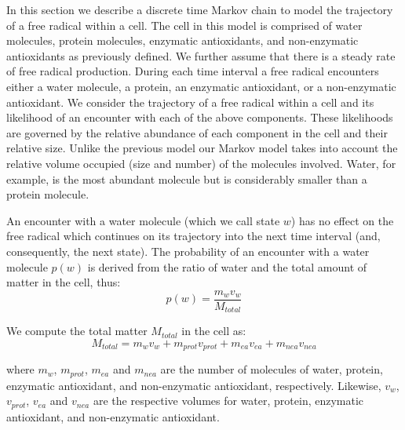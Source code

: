 \documentclass[preprint,12pt,authoryear]{elsarticle}
\begin{document}
In this section we describe a discrete time Markov chain to model the
trajectory of a free radical within a cell. The cell in this model is comprised
of water molecules, protein molecules, enzymatic antioxidants, and non-enzymatic
antioxidants as previously defined. We further assume that there is a steady rate of free radical production.
During each time interval a free radical encounters either a water molecule, a
protein, an enzymatic antioxidant, or a non-enzymatic antioxidant.
We consider the trajectory of a free radical within a cell and its
likelihood of an encounter with each of the above components.
These likelihoods are governed by the relative abundance of each
component in the cell and their relative size.
Unlike the previous model our Markov model takes into account the relative volume occupied (size and number) of the molecules 
involved. Water, for example, is the most abundant molecule but is considerably smaller than a protein molecule.



An encounter with a water molecule (which we call state $w$)
has no effect on the free radical which  continues on its trajectory into
the next time interval (and, consequently, the next state).
The probability of an encounter with a water molecule $p(w)$ is derived from the ratio
of water and the total amount of matter in the cell, thus:
\begin{equation}
p(w) = \frac{m_{w} v_{w}} {M_{total}}
\end{equation}

We compute the total matter $M_{total}$ in the cell as:
\begin{equation}
M_{total} = m_{w} v_{w} + m_{prot} v_{prot} + m_{ea} v_{ea} + m_{nea} v_{nea}
\end{equation}

{\parindent0pt
where $m_{w}$, $m_{prot}$, $m_{ea}$ and $m_{nea}$ are the number of molecules of water, protein, enzymatic antioxidant, and non-enzymatic antioxidant, respectively.
Likewise, $v_{w}$, $v_{prot}$, $v_{ea}$ and $v_{nea}$ are the respective volumes for water, protein, enzymatic antioxidant, and non-enzymatic antioxidant.
}
\end{document}
